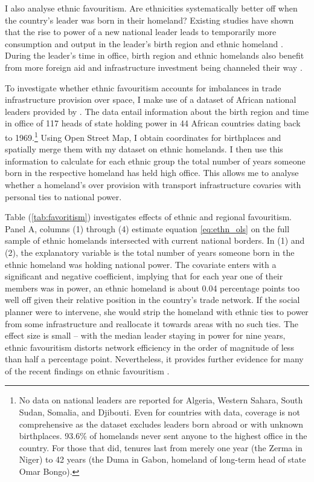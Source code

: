 \documentclass[11pt, oneside]{article}   	%
\let\oldref\ref
\renewcommand{\ref}[1]{(\oldref{#1})}
\begin{document}
I also analyse ethnic favouritism. Are ethnicities systematically better off when the country's leader was born in their homeland? Existing studies have shown that the rise to power of a new national leader leads to temporarily more consumption and output in the leader's birth region \citep{Hodler_RegionalFavoritism_2014} and ethnic homeland \citep{DeLuca_Ethnicfavoritismaxiom_2018}. During the leader's time in office, birth region and ethnic homelands also benefit from more foreign aid and infrastructure investment being channeled their way \citep{Dreher_AiddemandAfrican_2016,Burgess_ValueDemocracyEvidence_2015}.

To investigate whether ethnic favouritism accounts for imbalances in trade infrastructure provision over space, I make use of a dataset of African national leaders provided by \cite{Dreher_AiddemandAfrican_2016}. The data entail information about the birth region and time in office of 117 heads of state holding power in 44 African countries dating back to 1969.\footnote{No data on national leaders are reported for Algeria, Western Sahara, South Sudan, Somalia, and Djibouti. Even for countries with data, coverage is not comprehensive as the dataset excludes leaders born abroad or with unknown birthplaces. 93.6\% of homelands never sent anyone to the highest office in the country. For those that did, tenures last from merely one year (the Zerma in Niger) to 42 years (the Duma in Gabon, homeland of long-term head of state Omar Bongo).} Using Open Street Map, I obtain coordinates for birthplaces and spatially merge them with my dataset on ethnic homelands. I then use this information to calculate for each ethnic group the total number of years someone born in the respective homeland has held high office. This allows me to analyse whether a homeland's over provision with transport infrastructure covaries with personal ties to national power.

Table \ref{tab:favoritism} investigates effects of ethnic and regional favouritism. Panel A, columns (1) through (4) estimate equation \eqref{eq:ethn_ols} on the full sample of ethnic homelands intersected with current national borders. In (1) and (2), the explanatory variable is the total number of years someone born in the ethnic homeland was holding national power. The covariate enters with a significant and negative coefficient, implying that for each year one of their members was in power, an ethnic homeland is about 0.04 percentage points too well off given their relative position in the country's trade network. If the social planner were to intervene, she would strip the homeland with ethnic ties to power from some infrastructure and reallocate it towards areas with no such ties. The effect size is small -- with the median leader staying in power for nine years, ethnic favouritism distorts network efficiency in the order of magnitude of less than half a percentage point. Nevertheless, it provides further evidence for many of the recent findings on ethnic favouritism \citep{DeLuca_Ethnicfavoritismaxiom_2018}.
\end{document}
